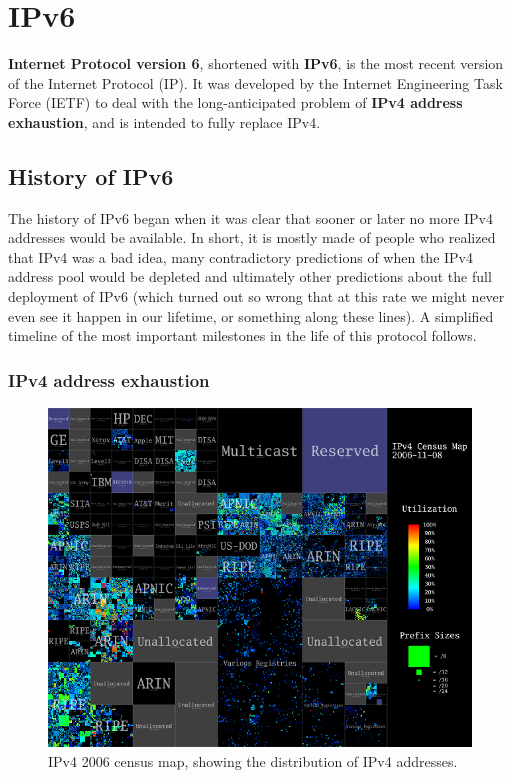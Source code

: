 \chapter{IPv6}
\label{ch:IPv6}
\textbf{Internet Protocol version 6}, shortened with \textbf{IPv6}, is the most recent version of the Internet Protocol (IP). It was developed by the Internet Engineering Task Force (IETF) to deal with the long-anticipated problem of \textbf{IPv4 address exhaustion}, and is intended to fully replace IPv4.


\section{History of IPv6}
The history of IPv6 began when it was clear that sooner or later no more IPv4 addresses would be available. In short, it is mostly made of people who realized that IPv4 was a bad idea, many contradictory predictions of when the IPv4 address pool would be depleted and ultimately other predictions about the full deployment of IPv6 (which turned out so wrong that at this rate we might never even see it happen in our lifetime, or something along these lines). A simplified timeline of the most important milestones in the life of this protocol follows.


\subsection{IPv4 address exhaustion}
\begin{figure}[h]
    \centering
    \includegraphics[scale=0.8]{img/ipv4_census_map.png}
    \decoRule
    \caption{IPv4 2006 census map, showing the distribution of IPv4 addresses.}
    \label{fig:ipv4_census_map}
\end{figure}

